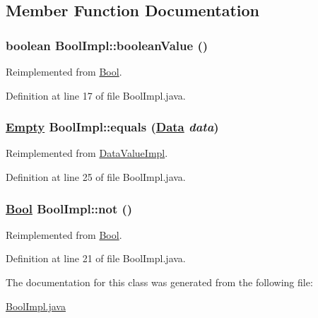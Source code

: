 \subsection{Member Function Documentation}
\hypertarget{classBoolImpl_a0}{
\subsubsection[booleanValue]{\setlength{\rightskip}{0pt plus 5cm}boolean Bool\-Impl::boolean\-Value ()}}
\label{classBoolImpl_a0}




Reimplemented from \hyperlink{interfaceBool_a0}{Bool}.

Definition at line 17 of file Bool\-Impl.java.\hypertarget{classBoolImpl_a2}{
\subsubsection[equals]{\setlength{\rightskip}{0pt plus 5cm}\hyperlink{interfaceEmpty}{Empty} Bool\-Impl::equals (\hyperlink{interfaceData}{Data} {\em data})}}
\label{classBoolImpl_a2}




Reimplemented from \hyperlink{classDataValueImpl_a5}{Data\-Value\-Impl}.

Definition at line 25 of file Bool\-Impl.java.\hypertarget{classBoolImpl_a1}{
\subsubsection[not]{\setlength{\rightskip}{0pt plus 5cm}\hyperlink{interfaceBool}{Bool} Bool\-Impl::not ()}}
\label{classBoolImpl_a1}




Reimplemented from \hyperlink{interfaceBool_a1}{Bool}.

Definition at line 21 of file Bool\-Impl.java.

The documentation for this class was generated from the following file:\begin{CompactItemize}
\item 
\hyperlink{BoolImpl_8java-source}{Bool\-Impl.java}\end{CompactItemize}

